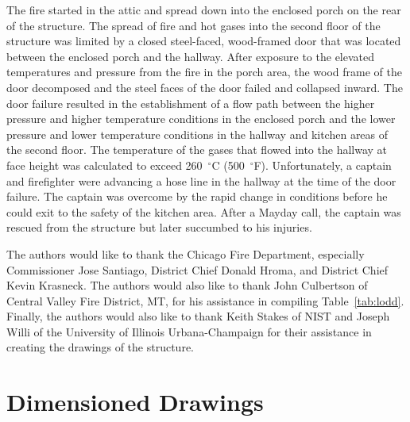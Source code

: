 The fire started in the attic and spread down into the enclosed porch on the rear of the structure. The spread of fire and hot gases into the second floor of the structure was limited by a closed steel-faced, wood-framed door that was located between the enclosed porch and the hallway. After exposure to the elevated temperatures and pressure from the fire in the porch area, the wood frame of the door decomposed and the steel faces of the door failed and collapsed inward. The door failure resulted in the establishment of a flow path between the higher pressure and higher temperature conditions in the enclosed porch and the lower pressure and lower temperature conditions in the hallway and kitchen areas of the second floor. The temperature of the gases that flowed into the hallway at face height was calculated to exceed 260~$^{\circ}$C (500~$^{\circ}$F). Unfortunately, a captain and firefighter were advancing a hose line in the hallway at the time of the door failure. The captain was overcome by the rapid change in conditions before he could exit to the safety of the kitchen area. After a Mayday call, the captain was rescued from the structure but later succumbed to his injuries.

\begin{acknowledgements}
The authors would like to thank the Chicago Fire Department, especially Commissioner Jose Santiago, District Chief Donald Hroma, and District Chief Kevin Krasneck. The authors would also like to thank John Culbertson of Central Valley Fire District, MT, for his assistance in compiling Table~\ref{tab:lodd}. Finally, the authors would also like to thank Keith Stakes of NIST and Joseph Willi of the University of Illinois Urbana-Champaign for their assistance in creating the drawings of the structure.
\end{acknowledgements}



\clearpage

\appendix

\section{Dimensioned Drawings}
\label{app_draw}

